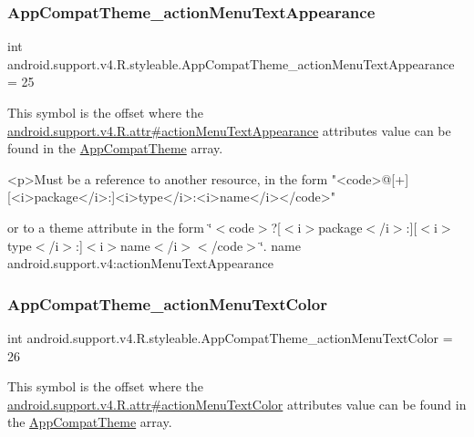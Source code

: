 \subsubsection{\texorpdfstring{App\+Compat\+Theme\+\_\+action\+Menu\+Text\+Appearance}{AppCompatTheme\_actionMenuTextAppearance}}
{\footnotesize\ttfamily int android.\+support.\+v4.\+R.\+styleable.\+App\+Compat\+Theme\+\_\+action\+Menu\+Text\+Appearance = 25\hspace{0.3cm}{\ttfamily [static]}}

This symbol is the offset where the \hyperlink{classandroid_1_1support_1_1v4_1_1R_1_1attr_a12413683f25fb0956f8a2693d7105b3b}{android.\+support.\+v4.\+R.\+attr\#action\+Menu\+Text\+Appearance} attribute\textquotesingle{}s value can be found in the \hyperlink{classandroid_1_1support_1_1v4_1_1R_1_1styleable_ac07ebbe62ed977f6dcaadc6397840ace}{App\+Compat\+Theme} array.

\begin{DoxyVerb}      <p>Must be a reference to another resource, in the form "<code>@[+][<i>package</i>:]<i>type</i>:<i>name</i></code>"
\end{DoxyVerb}
 or to a theme attribute in the form \char`\"{}$<$code$>$?\mbox{[}$<$i$>$package$<$/i$>$\+:\mbox{]}\mbox{[}$<$i$>$type$<$/i$>$\+:\mbox{]}$<$i$>$name$<$/i$>$$<$/code$>$\char`\"{}.  name android.\+support.\+v4\+:action\+Menu\+Text\+Appearance \mbox{\label{classandroid_1_1support_1_1v4_1_1R_1_1styleable_a42c5c79dac7e9099ffa7eec510614d9f}} 
\subsubsection{\texorpdfstring{App\+Compat\+Theme\+\_\+action\+Menu\+Text\+Color}{AppCompatTheme\_actionMenuTextColor}}
{\footnotesize\ttfamily int android.\+support.\+v4.\+R.\+styleable.\+App\+Compat\+Theme\+\_\+action\+Menu\+Text\+Color = 26\hspace{0.3cm}{\ttfamily [static]}}

This symbol is the offset where the \hyperlink{classandroid_1_1support_1_1v4_1_1R_1_1attr_adaa3e9913be4b47636888a613fcaf800}{android.\+support.\+v4.\+R.\+attr\#action\+Menu\+Text\+Color} attribute\textquotesingle{}s value can be found in the \hyperlink{classandroid_1_1support_1_1v4_1_1R_1_1styleable_ac07ebbe62ed977f6dcaadc6397840ace}{App\+Compat\+Theme} array.

